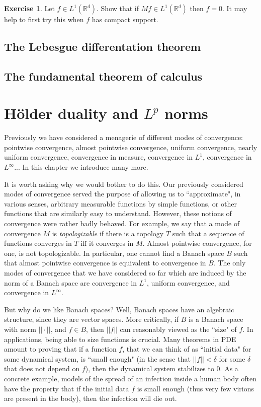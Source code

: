 \documentclass[12pt]{book}
\newcommand{\RR}{\mathbb{R}}
\newcommand{\dfn}[1]{\emph{#1}\index{#1}}
\theoremstyle{definition}
\newtheorem{exercise}[theorem]{Exercise}
\begin{document}
\begin{exercise}
Let $f \in L^1(\RR^d)$.
Show that if $Mf \in L^1(\RR^d)$ then $f = 0$.
It may help to first try this when $f$ has compact support.
\end{exercise}

\section{The Lebesgue differentation theorem}

\section{The fundamental theorem of calculus}

\chapter{H\"older duality and $L^p$ norms}
Previously we have considered a menagerie of different modes of convergence: pointwise convergence, almost pointwise convergence, uniform convergence, nearly uniform convergence, convergence in measure, convergence in $L^1$, convergence in $L^\infty$...
In this chapter we introduce many more.

It is worth asking why we would bother to do this.
Our previously considered modes of convergence served the purpose of allowing us to ``approximate", in various senses, arbitrary measurable functions by simple functions, or other functions that are similarly easy to understand.
However, these notions of convergence were rather badly behaved.
For example, we say that a mode of convergence $M$ is \dfn{topologizable} if there is a topology $T$ such that a sequence of functions converges in $T$ iff it converges in $M$.
Almost pointwise convergence, for one, is not topologizable.
In particular, one cannot find a Banach space $B$ such that almost pointwise convergence is equivalent to convergence in $B$.
The only modes of convergence that we have considered so far which are induced by the norm of a Banach space are convergence in $L^1$, uniform convergence, and convergence in $L^\infty$.

But why do we like Banach spaces? Well, Banach spaces have an algebraic structure, since they are vector spaces.
More critically, if $B$ is a Banach space with norm $||\cdot||$, and $f \in B$, then $||f||$ can reasonably viewed as the ``size" of $f$.
In applications, being able to size functions is crucial.
Many theorems in PDE amount to proving that if a function $f$, that we can think of as ``initial data" for some dynamical system, is ``small enough" (in the sense that $||f|| < \delta$ for some $\delta$ that does not depend on $f$), then the dynamical system stabilizes to $0$.
As a concrete example, models of the spread of an infection inside a human body often have the property that if the initial data $f$ is small enough (thus very few virions are present in the body), then the infection will die out.
\end{document}
